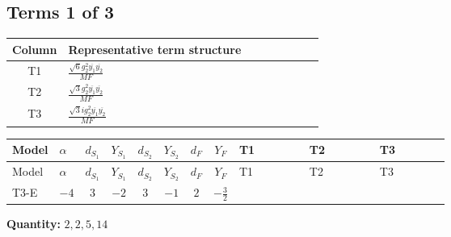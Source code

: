 \documentclass[8pt]{article}
\begin{document}
\begin{landscape}
\subsection*{Terms 1 of 3}
\begin{center}
\begin{tabular}{@{}c >{\raggedright\arraybackslash}p{0.82\linewidth}@{}}
\toprule
Column & Representative term structure \\
\midrule
T1 & \(\displaystyle \frac{\sqrt{6} g_{2}^{2} \overline{y_{1}} \overline{y_{2}}}{MF}\) \\
\midrule
T2 & \(\displaystyle \frac{\sqrt{3} g_{2}^{2} \overline{y_{1}} \overline{y_{2}}}{MF}\) \\
\midrule
T3 & \(\displaystyle \frac{\sqrt{3} i g_{2}^{2} \overline{y_{1}} \overline{y_{2}}}{MF}\) \\
\midrule
\bottomrule
\end{tabular}
\end{center}
\smallskip
\tiny
\begin{longtable}{@{}llcccccc >{\raggedright\arraybackslash}p{0.21\linewidth} >{\raggedright\arraybackslash}p{0.21\linewidth} >{\raggedright\arraybackslash}p{0.21\linewidth}@{}}
\toprule
Model & $\alpha$ & $d_{S_1}$ & $Y_{S_1}$ & $d_{S_2}$ & $Y_{S_2}$ & $d_F$ & $Y_F$ & T1 & T2 & T3 \\
\midrule
\endfirsthead
\toprule
Model & $\alpha$ & $d_{S_1}$ & $Y_{S_1}$ & $d_{S_2}$ & $Y_{S_2}$ & $d_F$ & $Y_F$ & T1 & T2 & T3 \\
\midrule
\endhead
T3-E & $-4$ & $3$ & $-2$ & $3$ & $-1$ & $2$ & $-\frac{3}{2}$ & \scriptsize\adjustbox{max width=\linewidth}{$\begin{gathered} - \frac{\sqrt{6} g_{2}^{2} \overline{y_{1}} \overline{y_{2}}}{3 MF}\end{gathered}$} & \scriptsize\adjustbox{max width=\linewidth}{$\begin{gathered} - \frac{\sqrt{3} g_{2}^{2} \overline{y_{1}} \overline{y_{2}}}{6 MF}\end{gathered}$} & \scriptsize\adjustbox{max width=\linewidth}{$\begin{gathered} - \frac{49 \sqrt{3} i g_{2}^{2} \overline{y_{1}} \overline{y_{2}}}{24 MF}\end{gathered}$} \\
\midrule
\bottomrule
\end{longtable}
\clearpage
\noindent\textbf{Quantity: }$\mathrm{2,2,5,14}$\par\smallskip

\end{landscape}
\end{document}
